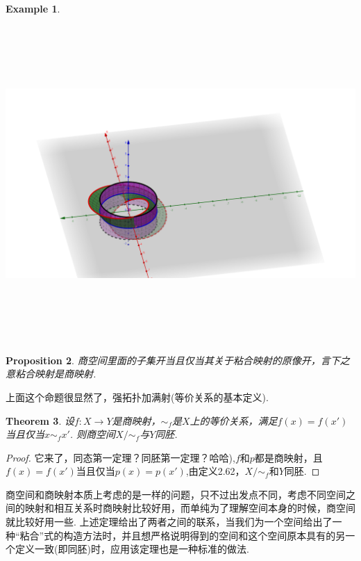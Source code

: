 \documentclass{article}
\newtheorem{theorem}{Theorem}[section]
\newtheorem{proposition}[theorem]{Proposition}
\newtheorem{example}[theorem]{Example}
\newcommand*{\xfunc}[4]{{#2}\colon{#3}{#1}{#4}}
\newcommand*{\func}[3]{\xfunc{\to}{#1}{#2}{#3}}
\begin{document}
\begin{example}
\begin{center}
\includegraphics[width=20cm, height=12cm]{images/gluing.png}
\end{center}
\end{example}


\begin{proposition}
商空间里面的子集开当且仅当其关于粘合映射的原像开，言下之意粘合映射是商映射.
\end{proposition}

上面这个命题很显然了，强拓扑加满射(等价关系的基本定义).

\begin{theorem}
设$\func{f}{X}{Y}$是商映射，$\sim_f$是$X$上的等价关系，满足$f(x)=f(x')$当且仅当$x \sim_f x'$. 则商空间$X / \sim_f$与$Y$同胚.
\end{theorem}

\begin{proof}
它来了，同态第一定理？同胚第一定理？哈哈),$f$和$p$都是商映射，且$f(x)=f(x')$当且仅当$p(x)=p(x')$,由定义2.62，$X / \sim_f$和$Y$同胚.
\end{proof}

商空间和商映射本质上考虑的是一样的问题，只不过出发点不同，考虑不同空间之间的映射和相互关系时商映射比较好用，而单纯为了理解空间本身的时候，商空间就比较好用一些. 上述定理给出了两者之间的联系，当我们为一个空间给出了一种“粘合”式的构造方法时，并且想严格说明得到的空间和这个空间原本具有的另一个定义一致(即同胚)时，应用该定理也是一种标准的做法.
\end{document}
